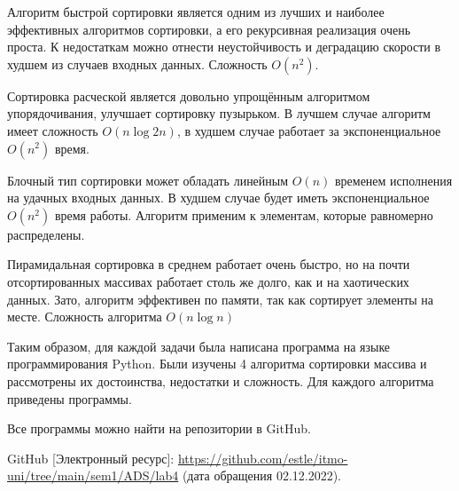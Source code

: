 \documentclass[14pt]{extreport}
\begin{document}
Алгоритм быстрой сортировки является одним из лучших и наиболее эффективных алгоритмов сортировки, а его рекурсивная реализация очень проста. К недостаткам можно отнести неустойчивость и деградацию скорости в худшем из случаев входных данных. Сложность $O(n^2)$.

Сортировка расческой является довольно упрощённым алгоритмом упорядочивания, улучшает сортировку пузырьком. В лучшем случае алгоритм имеет сложность $O(n\log 2n)$, в худшем случае работает за экспоненциальное $O(n^2)$ время.

Блочный тип сортировки может обладать линейным $O(n)$ временем исполнения на удачных входных данных. В худшем случае будет иметь экспоненциальное $O(n^2)$ время работы. Алгоритм применим к элементам, которые равномерно распределены.

Пирамидальная сортировка в среднем работает очень быстро, но на почти отсортированных массивах работает столь же долго, как и на хаотических данных. Зато, алгоритм эффективен по памяти, так как сортирует элементы на месте. Сложность алгоритма $O(n\log n)$

\conclusions

Таким образом, для каждой задачи была написана программа на языке программирования Python. Были изучены 4 алгоритма сортировки массива и рассмотрены их достоинства, недостатки и сложность. Для каждого алгоритма приведены программы.

Все программы можно найти на репозитории в GitHub\cite{bib1}.

\newpage
\begin{thebibliography}{99}

GitHub [Электронный ресурс]: \url{https://github.com/estle/itmo-uni/tree/main/sem1/ADS/lab4} (дата обращения 02.12.2022).

\end{thebibliography}
\end{document}
